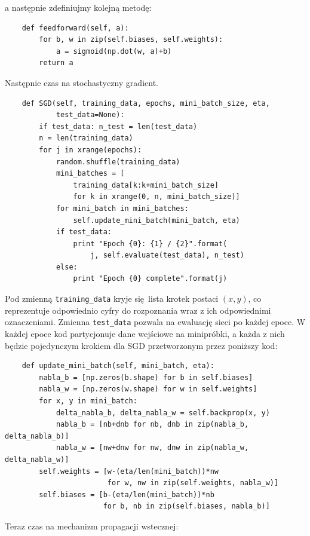 \documentclass[10pt, oneside]{article}
\theoremstyle{remark}
\begin{document}
a następnie zdefiniujmy kolejną metodę:
\begin{verbatim}
    def feedforward(self, a):
	    for b, w in zip(self.biases, self.weights):
	        a = sigmoid(np.dot(w, a)+b)
	    return a
\end{verbatim}
Następnie czas na stochastyczny gradient.
\begin{verbatim}
    def SGD(self, training_data, epochs, mini_batch_size, eta,
            test_data=None):
        if test_data: n_test = len(test_data)
        n = len(training_data)
        for j in xrange(epochs):
            random.shuffle(training_data)
            mini_batches = [
                training_data[k:k+mini_batch_size]
                for k in xrange(0, n, mini_batch_size)]
            for mini_batch in mini_batches:
                self.update_mini_batch(mini_batch, eta)
            if test_data:
                print "Epoch {0}: {1} / {2}".format(
                    j, self.evaluate(test_data), n_test)
            else:
                print "Epoch {0} complete".format(j)
\end{verbatim}
Pod zmienną \texttt{training_data} kryje się lista krotek postaci $(x, y)$, co reprezentuje odpowiednio cyfry do rozpoznania wraz z ich odpowiednimi oznaczeniami.
Zmienna \texttt{test_data} pozwala na ewaluację sieci po każdej epoce.
W każdej epoce kod partycjonuje dane wejściowe na minipróbki, a każda z nich będzie pojedynczym krokiem dla SGD przetworzonym przez poniższy kod:
\begin{verbatim}
    def update_mini_batch(self, mini_batch, eta):
        nabla_b = [np.zeros(b.shape) for b in self.biases]
        nabla_w = [np.zeros(w.shape) for w in self.weights]
        for x, y in mini_batch:
            delta_nabla_b, delta_nabla_w = self.backprop(x, y)
            nabla_b = [nb+dnb for nb, dnb in zip(nabla_b, delta_nabla_b)]
            nabla_w = [nw+dnw for nw, dnw in zip(nabla_w, delta_nabla_w)]
        self.weights = [w-(eta/len(mini_batch))*nw 
                        for w, nw in zip(self.weights, nabla_w)]
        self.biases = [b-(eta/len(mini_batch))*nb 
                       for b, nb in zip(self.biases, nabla_b)]
\end{verbatim}
Teraz czas na mechanizm propagacji wstecznej:
\end{document}
